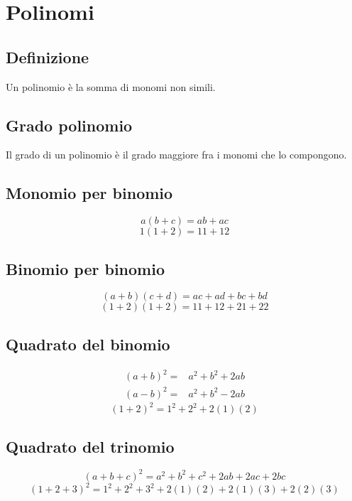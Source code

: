 \chapter{Polinomi}
\section{Definizione}
Un polinomio è la somma di monomi non simili.
\section{Grado polinomio}
Il grado di un polinomio è il grado maggiore fra i 
monomi che lo compongono.
\section{Monomio per binomio}
\begin{equation}
a(b+c)=ab+ac
\end{equation}
\begin{equation}
1(1+2)=11+12
\end{equation}
\section{Binomio per binomio}
\begin{equation}
(a+b)(c+d)=ac+ad+bc+bd
\end{equation}
\begin{equation}
(1+2)(1+2)=11+12+21+22
\end{equation}
\section{Quadrato del binomio}
\begin{align}
(a+b)^2=&a^2+b^2+2ab\\
(a-b)^2=&a^2+b^2-2ab
\end{align}
\begin{equation}
(1+2)^2=1^2+2^2+2(1)(2)
\end{equation}
\section{Quadrato del trinomio}
\begin{equation}
(a+b+c)^2=a^2+b^2+c^2+2ab+2ac+2bc
\end{equation}
\begin{equation}
(1+2+3)^2=1^2+2^2+3^2+2(1)(2)+2(1)(3)+2(2)(3)
\end{equation}
